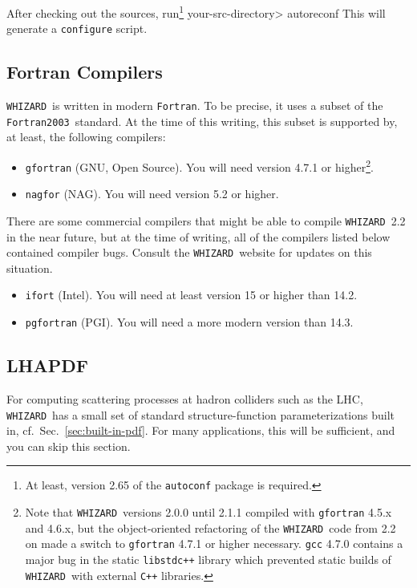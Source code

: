 \documentclass[12pt]{book}
\newenvironment{interaction}%
  {\begingroup\small
   \verbatim}%
  {\endverbatim
   \endgroup\noindent}
\newcommand{\ttt}[1]{\texttt{#1}}
\newcommand{\whizard}{\texttt{WHIZARD}}
\newcommand{\fortran}{\texttt{Fortran}}
\newcommand{\fortranOThree}{\texttt{Fortran2003}}
\begin{document}
After checking out the sources, run\footnote{At least, version 2.65 of
  the \ttt{autoconf} package is required.}
\begin{interaction}
  your-src-directory> autoreconf
\end{interaction}
This will generate a \ttt{configure} script.


\subsection{\label{sec:compilers}Fortran Compilers}

\whizard\ is written in modern \fortran.  To be precise, it uses a
subset of the \fortranOThree\ standard.  At the time of this writing,
this subset is supported by, at least, the following compilers:
\begin{itemize}
\item
  \ttt{gfortran} (GNU, Open Source).  You will need version 4.7.1
  or higher\footnote{Note that \whizard\ versions 2.0.0 until 2.1.1 compiled
  with \ttt{gfortran} 4.5.x and 4.6.x, but the object-oriented
  refactoring of the \whizard\ code from 2.2 on made a switch to
  \ttt{gfortran} 4.7.1 or higher necessary. \ttt{gcc} 4.7.0 contains a
  major bug in the static \ttt{libstdc++} library which prevented
  static builds of \whizard\ with external \ttt{C++} libraries.}. 
\item
  \ttt{nagfor} (NAG).  You will need version 5.2 or higher.
\end{itemize}
There are some commercial compilers that might be able to compile
\whizard\ 2.2 in the near future, but at the time of writing, all of
the compilers listed below contained compiler bugs. Consult the
\whizard\ website for updates on this situation. 
\begin{itemize}
\item
  \ttt{ifort} (Intel).  You will need at least version 15 or higher
  than 14.2.
\item
  \ttt{pgfortran} (PGI).  You will need a more modern version than 14.3.
\end{itemize}


\subsection{LHAPDF}
\label{sec:lhapdf}

For computing scattering processes at hadron colliders such as the
LHC, \whizard\ has a small set of standard structure-function
parameterizations built in, cf.\ Sec.~\ref{sec:built-in-pdf}.  For
many applications, this will be sufficient, and you can skip this
section.
\end{document}
